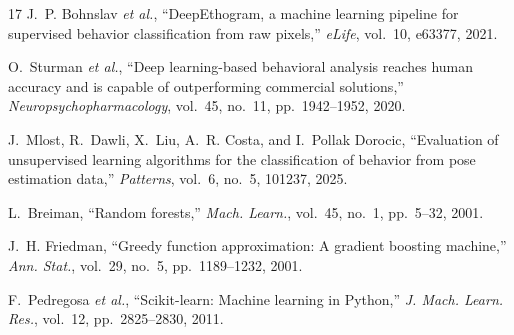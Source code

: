 \begin{thebibliography}{17}
J.~P. Bohnslav \emph{et al.}, ``DeepEthogram, a machine learning pipeline for supervised behavior classification from raw pixels,'' \emph{eLife}, vol.~10, e63377, 2021.

O.~Sturman \emph{et al.}, ``Deep learning-based behavioral analysis reaches human accuracy and is capable of outperforming commercial solutions,'' \emph{Neuropsychopharmacology}, vol.~45, no.~11, pp.~1942--1952, 2020.

J.~Mlost, R.~Dawli, X.~Liu, A.~R. Costa, and I.~Pollak Dorocic, ``Evaluation of unsupervised learning algorithms for the classification of behavior from pose estimation data,'' \emph{Patterns}, vol.~6, no.~5, 101237, 2025.

L.~Breiman, ``Random forests,'' \emph{Mach. Learn.}, vol.~45, no.~1, pp.~5--32, 2001.

J.~H. Friedman, ``Greedy function approximation: A gradient boosting machine,'' \emph{Ann. Stat.}, vol.~29, no.~5, pp.~1189--1232, 2001.

F.~Pedregosa \emph{et al.}, ``Scikit-learn: Machine learning in Python,'' \emph{J. Mach. Learn. Res.}, vol.~12, pp.~2825--2830, 2011.

\end{thebibliography}
